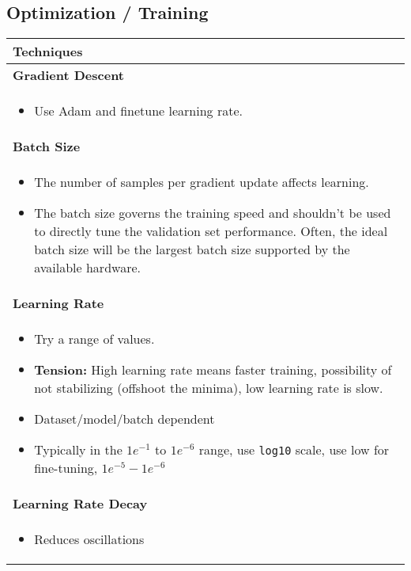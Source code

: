 \subsection{Optimization / Training}
\begin{summary}
    \begin{center}
        \begin{tabular}{l}
        \toprule
        \textbf{Techniques} \\
        \midrule
        \textbf{Gradient Descent} \\
        \multicolumn{1}{p{\linewidth}}{
        \begin{itemize}
            \item Use Adam and finetune learning rate.
        \end{itemize}} \\
        \midrule
        \textbf{Batch Size} \\
        \multicolumn{1}{p{\linewidth}}{
        \begin{itemize}
            \item The number of samples per gradient update affects learning.
            \item The batch size governs the training speed and shouldn't be used to directly tune the validation set performance. Often, the ideal batch size will be the largest batch size supported by the available hardware.
        \end{itemize}} \\
        \midrule
        \textbf{Learning Rate} \\
        \multicolumn{1}{p{\linewidth}}{
        \begin{itemize}
            \item Try a range of values. 
            \item \textbf{Tension:} High learning rate means faster training, possibility of not stabilizing (offshoot the minima), low learning rate is slow.  
            \item Dataset/model/batch dependent
            \item Typically in the $1e^{-1}$ to $1e^{-6}$ range, use \texttt{log10} scale, use low for fine-tuning, $1e^{-5} - 1e^{-6}$
        \end{itemize}} \\
        \midrule
        \textbf{Learning Rate Decay} \\
        \multicolumn{1}{p{\linewidth}}{
        \begin{itemize}
            \item Reduces oscillations

\end{itemize}}
\end{tabular}
\end{center}
\end{summary}

